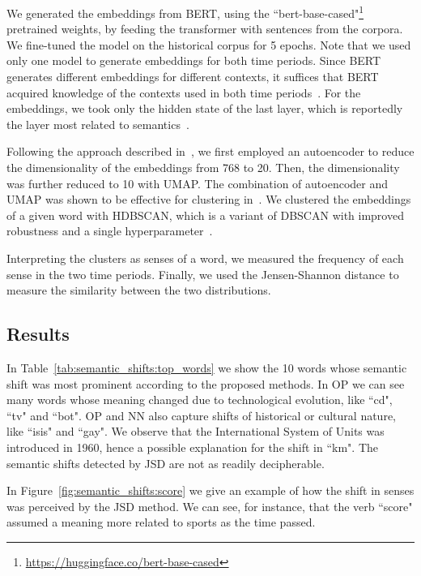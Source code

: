 \documentclass[runningheads]{llncs}
\begin{document}
We generated the embeddings from BERT, using the “bert-base-cased"\footnote{\url{https://huggingface.co/bert-base-cased}} pretrained weights, by feeding the transformer with sentences from the corpora. We fine-tuned the model on the historical corpus for 5 epochs. Note that we used only one model to generate embeddings for both time periods. Since BERT generates different embeddings for different contexts, it suffices that BERT acquired knowledge of the contexts used in both time periods~\cite{martinc-etal-2020-leveraging}. For the embeddings, we took only the hidden state of the last layer, which is reportedly the layer most related to semantics~\cite{laicher-etal-2021-explaining}.

Following the approach described in~\cite{rother-etal-2020-cmce}, we first employed an autoencoder to reduce the dimensionality of the embeddings from 768 to 20. Then, the dimensionality was further reduced to 10 with UMAP. The combination of autoencoder and UMAP was shown to be effective for clustering in~\cite{mcconville-etal-2019-n2d}. We clustered the embeddings of a given word with HDBSCAN, which is a variant of DBSCAN with improved robustness and a single hyperparameter~\cite{campello-etal-2013-hdbscan}. 

Interpreting the clusters as senses of a word, we measured the frequency of each sense in the two time periods. Finally, we used the Jensen-Shannon distance to measure the similarity between the two distributions.

\subsection{Results}
\label{subsec:semantic_shifts:results}

In Table~\ref{tab:semantic_shifts:top_words} we show the 10 words whose semantic shift was most prominent according to the proposed methods. In OP we can see many words whose meaning changed due to technological evolution, like “cd", “tv" and “bot". OP and NN also capture shifts of historical or cultural nature, like “isis" and “gay". We observe that the International System of Units was introduced in 1960, hence a possible explanation for the shift in “km". The semantic shifts detected by JSD are not as readily decipherable. 

In Figure~\ref{fig:semantic_shifts:score} we give an example of how the shift in senses was perceived by the JSD method. We can see, for instance, that the verb “score" assumed a meaning more related to sports as the time passed.
\end{document}
